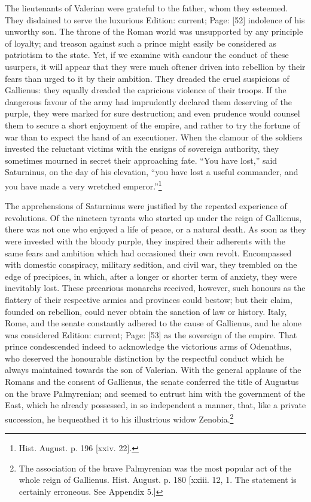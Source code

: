 The lieutenants of Valerian were grateful to the father, whom they esteemed. They disdained to serve the luxurious Edition: current; Page: [52] indolence of his unworthy son. The throne of the Roman world was unsupported by any principle of loyalty; and treason against such a prince might easily be considered as patriotism to the state. Yet, if we examine with candour the conduct of these usurpers, it will appear that they were much oftener driven into rebellion by their fears than urged to it by their ambition. They dreaded the cruel suspicions of Gallienus: they equally dreaded the capricious violence of their troops. If the dangerous favour of the army had imprudently declared them deserving of the purple, they were marked for sure destruction; and even prudence would counsel them to secure a short enjoyment of the empire, and rather to try the fortune of war than to expect the hand of an executioner. When the clamour of the soldiers invested the reluctant victims with the ensigns of sovereign authority, they sometimes mourned in secret their approaching fate. \texthebrew{“}You have lost,\texthebrew{}” said Saturninus, on the day of his elevation, \texthebrew{“}you have lost a useful commander, and you have made a very wretched emperor.\texthebrew{}”\footnote{Hist. August. p. 196 [xxiv. 22].}

The apprehensions of Saturninus were justified by the repeated experience of revolutions. Of the nineteen tyrants who started up under the reign of Gallienus, there was not one who enjoyed a life of peace, or a natural death. As soon as they were invested with the bloody purple, they inspired their adherents with the same fears and ambition which had occasioned their own revolt. Encompassed with domestic conspiracy, military sedition, and civil war, they trembled on the edge of precipices, in which, after a longer or shorter term of anxiety, they were inevitably lost. These precarious monarchs received, however, such honours as the flattery of their respective armies and provinces could bestow; but their claim, founded on rebellion, could never obtain the sanction of law or history. Italy, Rome, and the senate constantly adhered to the cause of Gallienus, and he alone was considered Edition: current; Page: [53] as the sovereign of the empire. That prince condescended indeed to acknowledge the victorious arms of Odenathus, who deserved the honourable distinction by the respectful conduct which he always maintained towards the son of Valerian. With the general applause of the Romans and the consent of Gallienus, the senate conferred the title of Augustus on the brave Palmyrenian; and seemed to entrust him with the government of the East, which he already possessed, in so independent a manner, that, like a private succession, he bequeathed it to his illustrious widow Zenobia.\footnote{The association of the brave Palmyrenian was the most popular act of the whole reign of Gallienus. Hist. August. p. 180 [xxiii. 12, 1. The statement is certainly erroneous. See Appendix 5.]}

